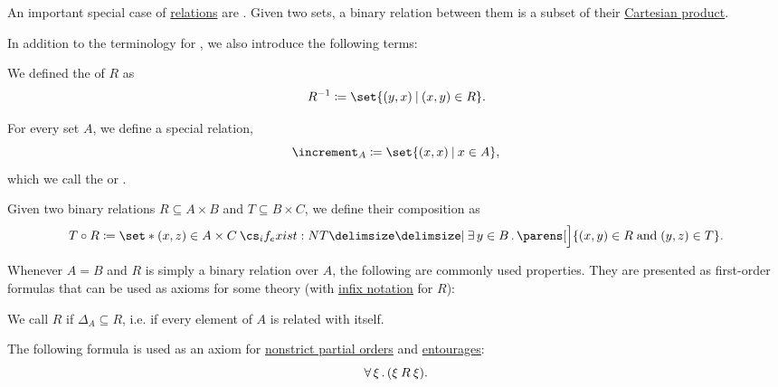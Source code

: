 \begin{definition}\label{def:binary_relation}
  An important special case of \hyperref[def:relation]{relations} are . Given two sets, a binary relation between them is a subset of their \hyperref[def:cartesian_product]{Cartesian product}.

  In addition to the terminology for , we also introduce the following terms:
  \begin{thmenum}[series=def:binary_relation]
     We defined the  of \( R \) as
    \begin{equation*}
      R^{-1} \coloneqq \set{ (y, x) \given (x, y) \in R }.
    \end{equation*}

     For every set \( A \), we define a special relation,
    \begin{equation*}
      \increment_A \coloneqq \set{ (x, x) \given x \in A },
    \end{equation*}
    which we call the  or .

     Given two binary relations \( R \subseteq A \times B \) and \( T \subseteq B \times C \), we define their composition as
    \begin{equation*}
      T \bincirc R \coloneqq \set*{ (x, z) \in A \times C \given* \qexists {y \in B} \parens[\Big]{ (x, y) \in R \T{and} (y, z) \in T } }.
    \end{equation*}
  \end{thmenum}

  Whenever \( A = B \) and \( R \) is simply a binary relation over \( A \), the following are commonly used properties. They are presented as first-order formulas that can be used as axioms for some theory (with \hyperref[rem:first_order_formula_conventions/infix]{infix notation} for \( R \)):
  \begin{thmenum}[resume=def:binary_relation]
     We call \( R \)  if \( \Delta_A \subseteq R \), i.e. if every element of \( A \) is related with itself.

    The following formula is used as an axiom for \hyperref[thm:strict_partial_order]{nonstrict partial orders} and \hyperref[def:entourage]{entourages}:
    \begin{equation}\label{eq:def:binary_relation/reflexive}
      \forall \thinspace \xi \thinspace . \thinspace (\xi \mathbin{R} \xi).
    \end{equation}


\end{thmenum}
\end{definition}
